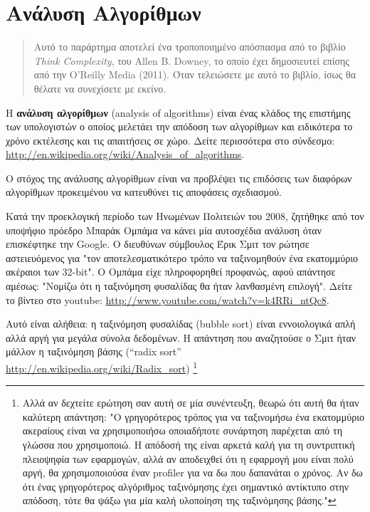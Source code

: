\documentclass[10pt]{book}
\begin{document}
\chapter{Ανάλυση Αλγορίθμων}

\begin{quote}
Αυτό το παράρτημα αποτελεί ένα τροποποιημένο απόσπασμα από το βιβλίο {\it Think Complexity},
του Allen B. Downey, το οποίο έχει δημοσιευτεί επίσης από την O'Reilly Media (2011). Όταν τελειώσετε
με αυτό το βιβλίο, ίσως θα θέλατε να συνεχίσετε με εκείνο.
\end{quote}

Η {\bf ανάλυση αλγορίθμων} (analysis of algorithms) είναι ένας κλάδος της επιστήμης των υπολογιστών
ο οποίος μελετάει την απόδοση των αλγορίθμων και ειδικότερα το χρόνο εκτέλεσης και τις απαιτήσεις σε χώρο.
Δείτε περισσότερα στο σύνδεσμο: \url{http://en.wikipedia.org/wiki/Analysis_of_algorithms}. 
 

Ο στόχος της ανάλυσης αλγορίθμων είναι να προβλέψει τις επιδόσεις των διαφόρων 
αλγορίθμων προκειμένου να κατευθύνει τις αποφάσεις σχεδιασμού.

Κατά την προεκλογική περίοδο των Ηνωμένων Πολιτειών του 2008, ζητήθηκε από τον υποψήφιο πρόεδρο
Μπαράκ Ομπάμα να κάνει μία αυτοσχέδια ανάλυση όταν επισκέφτηκε την Google.  Ο διευθύνων σύμβουλος Έρικ Σμιτ
τον ρώτησε αστειευόμενος για "τον αποτελεσματικότερο τρόπο να ταξινομηθούν ένα εκατομμύριο ακέραιοι των 32-bit".
Ο Ομπάμα είχε πληροφορηθεί προφανώς, αφού απάντησε αμέσως: "Νομίζω ότι η ταξινόμηση φυσαλίδας θα ήταν λανθασμένη επιλογή".  Δείτε το βίντεο στο youtube: \url{http://www.youtube.com/watch?v=k4RRi_ntQc8}.

Αυτό είναι αλήθεια: η ταξινόμηση φυσαλίδας (bubble sort) είναι εννοιολογικά απλή αλλά 
αργή για μεγάλα σύνολα δεδομένων.  Η απάντηση που αναζητούσε ο Σμιτ ήταν μάλλον η ταξινόμηση βάσης
(``radix sort'' \url{http://en.wikipedia.org/wiki/Radix_sort})
 \footnote{
Αλλά αν δεχτείτε ερώτηση σαν αυτή σε μία συνέντευξη, θεωρώ ότι αυτή θα ήταν καλύτερη απάντηση:
"Ο γρηγορότερος τρόπος για να ταξινομήσω ένα εκατομμύριο ακεραίους είναι να χρησιμοποιήσω οποιαδήποτε
συνάρτηση παρέχεται από τη γλώσσα που χρησιμοποιώ.  Η απόδοσή της είναι αρκετά καλή για τη συντριπτική
πλειοψηφία των εφαρμογών, αλλά αν αποδειχθεί ότι η εφαρμογή μου είναι πολύ αργή, θα χρησιμοποιούσα έναν
profiler για να δω που δαπανάται ο χρόνος.  Αν δω ότι ένας γρηγορότερος αλγόριθμος ταξινόμησης έχει
σημαντικό αντίκτυπο στην απόδοση, τότε θα ψάξω για μία καλή υλοποίηση της ταξινόμησης βάσης."}
\end{document}
